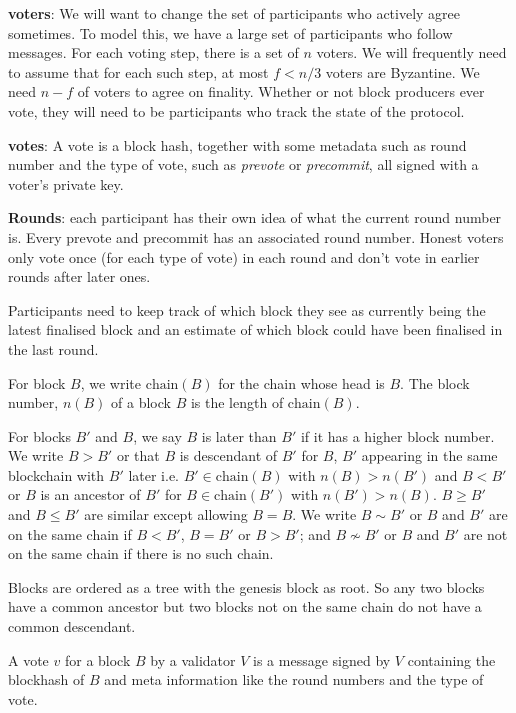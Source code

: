 \documentclass{article}
\begin{document}
{\bf voters}: We will want to change the set of participants who actively agree sometimes. To model this, we have a large set of participants who follow messages.
For each voting step, there is a set of $n$ voters.
We will frequently need to assume that for each such step, at most  $f < n/3$ voters are Byzantine.
We need $n-f$ of voters to agree on finality. Whether or not block producers ever vote, they will need to be participants who track the state of the protocol.

{\bf votes}: A vote is a block hash, together with some metadata such as round number and the type of vote, such as {\em prevote} or {\em precommit}, all signed with a voter's private key.

{\bf Rounds}: each participant has their own idea of what the current round number is. Every prevote and precommit has an associated round number. Honest voters only vote once (for each type of vote) in each round and don't vote in earlier rounds after later ones.

Participants need to keep track of which block they see as currently being the latest finalised block and an estimate of which block could have been finalised in the last round. 




For block $B$, we write $\mathrm{chain}(B)$ for the chain whose head is $B$. The block number, $n(B)$ of a block $B$ is the length of $\mathrm{chain}(B)$.

For blocks $B'$ and $B$, we say $B$ is later than $B'$ if it has a higher block number.
We write $B > B'$ or that $B$ is descendant of $B'$ for $B$, $B'$ appearing in the same blockchain with $B'$ later i.e. $B' \in \mathrm{chain}(B)$ with $n(B) > n(B')$ and $B < B'$ or $B$ is an ancestor of $B'$ for $B \in \mathrm{chain}(B')$ with $n(B') > n(B)$.
$B \geq B'$ and $B \leq B'$ are similar except allowing $B = B$.
We write $B \sim B'$ or $B$ and $B'$ are on the same chain if $B<B'$, $B=B'$ or $B> B'$; and $B \nsim B'$ or $B$ and $B'$ are not on the same chain if there is no such chain.

Blocks are ordered as a tree with the genesis block as root. So any two blocks have a common ancestor but two blocks not on the same chain do not have a common descendant.

A vote $v$ for a block $B$ by a validator $V$ is a message signed by $V$ containing the blockhash of $B$ and meta information like the round numbers and the type of vote. 
\end{document}
